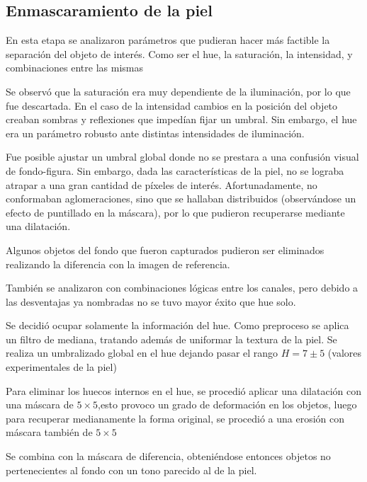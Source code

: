 \documentclass[conference,a4paper,10pt,oneside,final]{tfmpd}
\begin{document}
   	 \subsection{Enmascaramiento de la piel}
   		 En esta etapa se analizaron parámetros que pudieran hacer
   		 más factible la separación del objeto de interés.
   		 Como ser el hue, la saturación, la intensidad, y combinaciones entre las mismas
   		 
   		 Se observó que la saturación era muy dependiente de la iluminación, por lo que fue descartada.
   		 En el caso de la intensidad cambios en la posición del objeto creaban sombras y reflexiones que impedían fijar un umbral.
   		 Sin embargo, el hue era un parámetro robusto ante distintas intensidades de iluminación.
		
		Fue posible ajustar un umbral global donde no se prestara a una confusión visual de fondo-figura.
		Sin embargo, dada las características de la piel, no se lograba atrapar a una gran cantidad de píxeles de interés. 
Afortunadamente, no conformaban aglomeraciones, sino que se hallaban distribuidos (observándose un efecto de puntillado en la máscara), 
por lo que pudieron recuperarse mediante una dilatación.

Algunos objetos del fondo que fueron capturados pudieron ser eliminados realizando la diferencia con la imagen de referencia. 
   		 
   		 También se analizaron con combinaciones lógicas entre los canales, pero debido a las desventajas ya nombradas
   		 no se tuvo mayor éxito que hue solo.

		Se decidió ocupar solamente la información del hue.
		Como preproceso se aplica un filtro de mediana, tratando además de uniformar la textura de la piel.
   		 Se realiza un umbralizado global en el hue dejando pasar el rango $H = 7 \pm 5$ (valores experimentales de la piel)

   		 Para eliminar los huecos internos en el hue, se procedió aplicar una dilatación con una máscara de $5 \times 5$,esto provoco un grado de deformación
   		 en los objetos, luego para recuperar medianamente la forma original, se procedió a una erosión con máscara también de $5 \times 5$

   		 Se combina con la máscara de diferencia, obteniéndose entonces
   		 objetos no pertenecientes al fondo con un tono parecido al de la piel.
\end{document}
